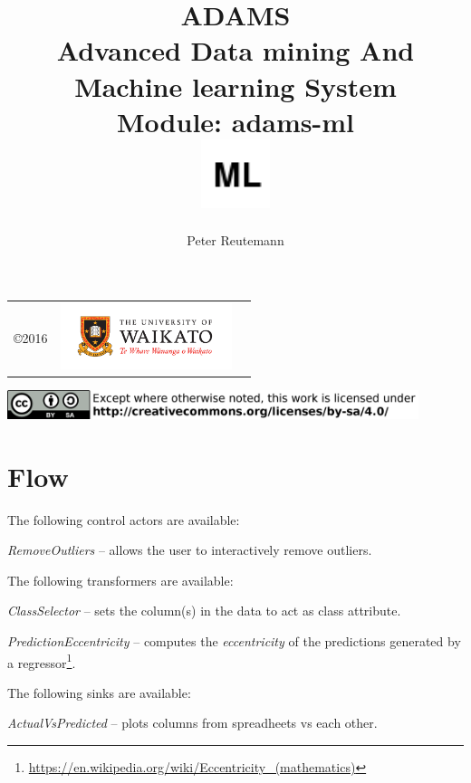 \documentclass[a4paper]{book}
\title{
  \textbf{ADAMS} \\
  {\Large \textbf{A}dvanced \textbf{D}ata mining \textbf{A}nd \textbf{M}achine
  learning \textbf{S}ystem} \\
  {\Large Module: adams-ml} \\
  \vspace{1cm}
  \includegraphics[width=2cm]{images/ml-module.png} \\
}
\author{
  Peter Reutemann
}
\begin{document}
\begin{titlepage}
\maketitle

\thispagestyle{empty}
\center
\begin{table}[b]
	\begin{tabular}{c l l}
		\parbox[c][2cm]{2cm}{\copyright 2016} &
		\parbox[c][2cm]{5cm}{\includegraphics[width=5cm]{images/coat_of_arms.pdf}}
	\end{tabular}
	\includegraphics[width=12cm]{images/cc.png} \\
\end{table}

\end{titlepage}

\tableofcontents

\chapter{Flow}

The following control actors are available:
\begin{tight_itemize}
  \item \textit{RemoveOutliers} -- allows the user to interactively remove
  outliers.
\end{tight_itemize}

The following transformers are available:
\begin{tight_itemize}
  \item \textit{ClassSelector} -- sets the column(s) in the data to act as
  class attribute.
  \item \textit{PredictionEccentricity} -- computes the \textit{eccentricity}
  of the predictions generated by a regressor\footnote{\url{https://en.wikipedia.org/wiki/Eccentricity_(mathematics)}{}}.
\end{tight_itemize}

The following sinks are available:
\begin{tight_itemize}
  \item \textit{ActualVsPredicted} -- plots columns from spreadheets vs
  each other.
\end{tight_itemize}
\end{document}
